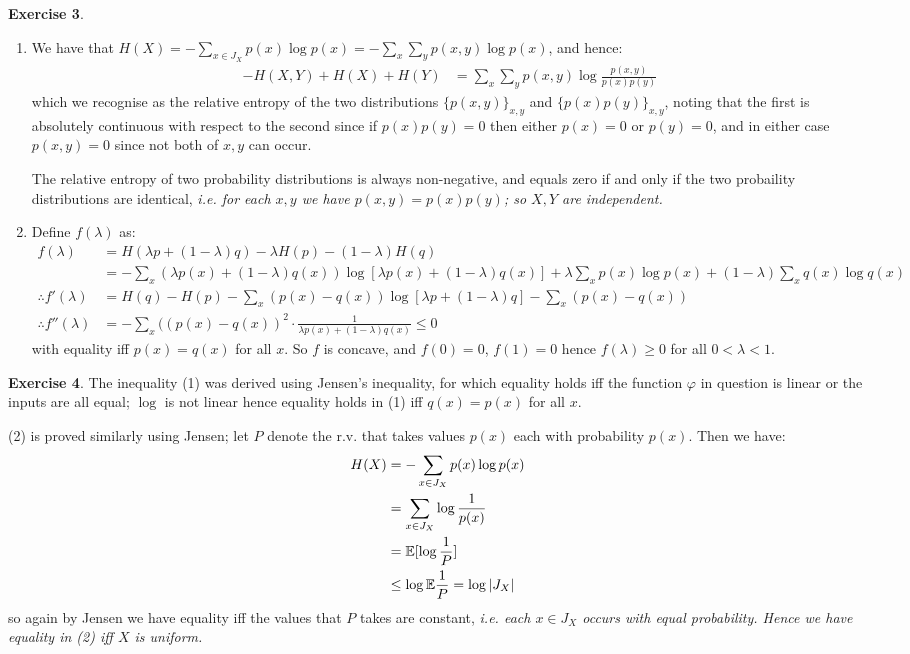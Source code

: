 \documentclass[]{article}
\begin{document}
\textbf{Exercise 3}.
\begin{enumerate}
    \item We have that $H(X) = -\sum_{x\in J_X}p(x)\log p(x) = -\sum_x \sum_y p(x,y)\log p(x)$, and hence:
    \begin{align*}
        -H(X,Y) + H(X) + H(Y) &= \sum_{x}\sum_{y}p(x,y)\log\frac{p(x,y)}{p(x)p(y)}
    \end{align*}
    which we recognise as the relative entropy of the two distributions $\{p(x,y)\}_{x,y}$ and $\{p(x)p(y)\}_{x,y}$, noting that the first is absolutely continuous with respect to the second since if $p(x)p(y) = 0$ then either $p(x) = 0$ or $p(y) = 0$, and in either case $p(x,y) = 0$ since not both of $x,y$ can occur.

    The relative entropy of two probability distributions is always non-negative, and equals zero if and only if the two probaility distributions are identical, \it{i.e.} for each $x,y$ we have $p(x,y) = p(x)p(y)$; so $X,Y$ are independent.

    \item Define $f(\lambda)$ as:
    \begin{align*}
        f(\lambda) &= H(\lambda p + (1 - \lambda ) q) - \lambda H(p) - (1-\lambda)H(q)\\
        &=-\sum_{x} (\lambda p(x) + (1-\lambda)q(x))\log [\lambda p(x) + (1-\lambda)q(x)] + \lambda\sum_x p(x)\log p(x) + (1 - \lambda) \sum_x q(x) \log q(x)\\
        \therefore f'(\lambda) &= H(q) - H(p) - \sum_x (p(x)-q(x))\log [\lambda p + (1-\lambda) q] - \sum_x (p(x) - q(x))\\
        \therefore f''(\lambda) &= -\sum_x ((p(x) - q(x))^2\cdot\frac{1}{\lambda p(x) + (1-\lambda)q(x)} \le 0
    \end{align*}
    with equality iff $p(x) = q(x)$ for all $x$. So $f$ is concave, and $f(0) = 0$, $f(1) = 0$ hence $f(\lambda) \ge 0$ for all $ 0 < \lambda < 1$.
\end{enumerate}

\textbf{Exercise 4}. The inequality (1) was derived using Jensen's inequality, for which equality holds iff the function $\varphi$ in question is linear or the inputs are all equal; $\log$ is not linear hence equality holds in (1) iff $q(x) = p(x)$ for all $x$.

(2) is proved similarly using Jensen; let $P$ denote the r.v. that takes values $p(x)$ each with probability $p(x)$. Then we have:
\begin{align*}
    H(X) &= -\sum_{x\in J_X} p(x)\log p(x)\\
    &= \sum_{x\in J_X} \log \frac{1}{p(x)}\\
    &= \mathbb{E}[\log \frac{1}{P}]\\
    &\le \log \mathbb{E}\frac{1}{P} = \log |J_X|
\end{align*}
so again by Jensen we have equality iff the values that $P$ takes are constant, \it{i.e.} each $x \in J_X$ occurs with equal probability. Hence we have equality in (2) iff $X$ is uniform.
\end{document}
